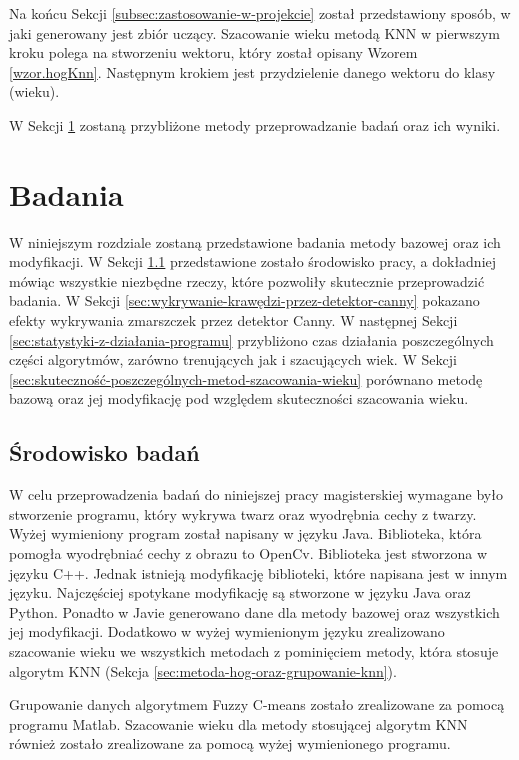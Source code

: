 \documentclass[a4paper,twoside,12pt]{book}
\begin{document}
    Na końcu Sekcji \ref{subsec:zastosowanie-w-projekcie} został przedstawiony sposób, w jaki generowany jest zbiór
    uczący.
    Szacowanie wieku metodą KNN w pierwszym kroku polega na stworzeniu wektoru, który został opisany
    Wzorem \ref{wzor.hogKnn}.
    Następnym krokiem jest przydzielenie danego wektoru do klasy (wieku).

    W Sekcji \ref{ch:badania} zostaną przybliżone metody przeprowadzanie badań oraz ich wyniki.

    \chapter{Badania}\label{ch:badania}
    W niniejszym rozdziale zostaną przedstawione badania metody bazowej oraz ich modyfikacji.
    W Sekcji \ref{sec:środowisko-pracy} przedstawione zostało środowisko pracy, a dokładniej mówiąc wszystkie
    niezbędne rzeczy, które pozwoliły skutecznie przeprowadzić badania.
    W Sekcji \ref{sec:wykrywanie-krawędzi-przez-detektor-canny} pokazano efekty wykrywania zmarszczek przez detektor
    Canny. W następnej Sekcji \ref{sec:statystyki-z-działania-programu} przybliżono czas działania poszczególnych
    części algorytmów, zarówno trenujących jak i szacujących wiek.
    W Sekcji \ref{sec:skuteczność-poszczególnych-metod-szacowania-wieku} porównano metodę bazową oraz jej modyfikację
    pod względem skuteczności szacowania wieku.

    \section{Środowisko badań}\label{sec:środowisko-pracy}

    W celu przeprowadzenia badań do niniejszej pracy magisterskiej wymagane było stworzenie programu,
    który wykrywa twarz oraz wyodrębnia cechy z twarzy. Wyżej wymieniony program został napisany w języku Java.
    Biblioteka, która pomogła wyodrębniać cechy z obrazu to OpenCv. Biblioteka jest stworzona w języku C++. Jednak
    istnieją modyfikację biblioteki, które napisana jest w innym języku. Najczęściej spotykane modyfikację są
    stworzone w języku Java oraz Python. Ponadto w Javie generowano dane dla metody bazowej oraz wszystkich
    jej modyfikacji. Dodatkowo w wyżej wymienionym języku zrealizowano szacowanie wieku we wszystkich metodach z
    pominięciem metody, która stosuje algorytm KNN (Sekcja \ref{sec:metoda-hog-oraz-grupowanie-knn}).

    Grupowanie danych algorytmem Fuzzy C-means zostało zrealizowane za pomocą programu Matlab.
    Szacowanie wieku dla metody stosującej algorytm KNN również zostało zrealizowane za pomocą wyżej wymienionego
    programu.
\end{document}
